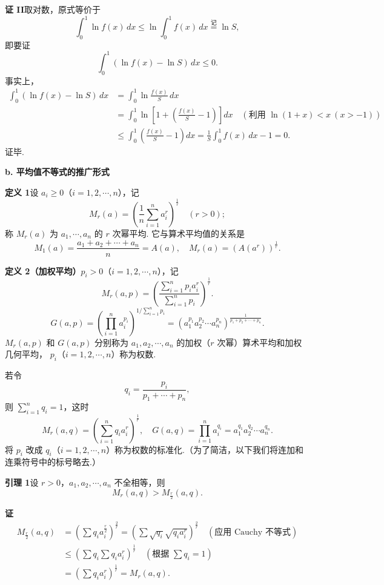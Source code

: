 \documentclass[UTF8,12pt,a4paper,fontset=fandol]{ctexart}
\begin{document}
\noindent\textbf{证 II}\quad 取对数，原式等价于
\[
\int_0^1\ln f(x)\,dx\le\ln\int_0^1 f(x)\,dx\stackrel{\text{记}}{=}\ln S,
\]
即要证
\[
\int_0^1(\ln f(x)-\ln S)\,dx\le0.
\]
事实上，
\[
\begin{aligned}
\int_0^1(\ln f(x)-\ln S)\,dx
&=\int_0^1\ln\frac{f(x)}S\,dx\\
&=\int_0^1\ln\left[1+\left(\frac{f(x)}S-1\right)\right]dx
\quad(\text{利用 }\ln(1+x)<x\ (x>-1))\\
&\le\int_0^1\left(\frac{f(x)}S-1\right)dx
=\frac1S\int_0^1 f(x)\,dx-1=0.
\end{aligned}
\]
证毕.

\noindent\textbf{b. 平均值不等式的推广形式}

\noindent\textbf{定义 1}\quad 设 $a_i\ge0$（$i=1,2,\cdots,n$），记
\[
M_r(a)=\left(\frac1n\sum_{i=1}^n a_i^r\right)^{\frac1r}\quad(r>0);
\]
称 $M_r(a)$ 为 $a_1,\cdots,a_n$ 的 $r$ 次幂平均. 它与算术平均值的关系是
\[
M_1(a)=\frac{a_1+a_2+\cdots+a_n}{n}=A(a),\quad
M_r(a)=(A(a^r))^{\frac1r}.
\]

\noindent\textbf{定义 2（加权平均）}\quad $p_i>0$（$i=1,2,\cdots,n$），记
\[
M_r(a,p)=\left(\frac{\sum_{i=1}^n p_i a_i^r}{\sum_{i=1}^n p_i}\right)^{\frac1r}.
\]
\[
G(a,p)=\left(\prod_{i=1}^n a_i^{p_i}\right)^{1/\sum_{i=1}^n p_i}
=(a_1^{p_1}a_2^{p_2}\cdots a_n^{p_n})^{\frac1{p_1+p_2+\cdots+p_n}}.
\]
$M_r(a,p)$ 和 $G(a,p)$ 分别称为 $a_1,a_2,\cdots,a_n$ 的加权（$r$ 次幂）算术平均和加权几何平均，
$p_i$（$i=1,2,\cdots,n$）称为权数.

若令
\[
q_i=\frac{p_i}{p_1+\cdots+p_n},
\]
则 $\sum_{i=1}^n q_i=1$，这时
\[
M_r(a,q)=\left(\sum_{i=1}^n q_i a_i^r\right)^{\frac1r},\quad
G(a,q)=\prod_{i=1}^n a_i^{q_i}=a_1^{q_1}a_2^{q_2}\cdots a_n^{q_n}.
\]
将 $p_i$ 改成 $q_i$（$i=1,2,\cdots,n$）称为权数的标准化.（为了简洁，以下我们将连加和连乘符号中的标号略去.）

\noindent\textbf{引理 1}\quad 设 $r>0$，$a_1,a_2,\cdots,a_n$ 不全相等，则
\[
M_r(a,q)>M_{\frac r2}(a,q).
\]

\noindent\textbf{证}\quad
\[
\begin{aligned}
M_{\frac r2}(a,q)
&=\left(\sum q_i a_i^{\frac r2}\right)^{\frac2r}
=\left(\sum \sqrt{q_i}\sqrt{q_i a_i^r}\right)^{\frac2r}\quad(\text{应用 Cauchy 不等式})\\
&\le\left(\sum q_i\sum q_i a_i^r\right)^{\frac1r}\quad(\text{根据 }\sum q_i=1)\\
&=\left(\sum q_i a_i^r\right)^{\frac1r}=M_r(a,q).
\end{aligned}
\]
\end{document}
